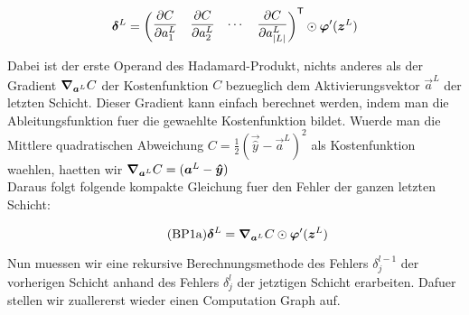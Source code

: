 \begin{equation*}
  \bm{\delta}^L = \begin{pmatrix} \displaystyle\frac{\partial C}{\partial a_1^L} & \displaystyle\frac{\partial C}{\partial a_2^L} & \cdots & \displaystyle\frac{\partial C}{\partial a_{|L|}^L}\end{pmatrix}^{\mathsf{T}} \odot \bm{\varphi}'(\bm{z}^L)
\end{equation*}

Dabei ist der erste Operand des Hadamard-Produkt, nichts anderes als
der Gradient $\bm{\nabla}_{\bm{a}^L} C$ der Kostenfunktion $C$ bezueglich dem Aktivierungsvektor
$\vec{a}^L$ der letzten Schicht. Dieser Gradient kann einfach berechnet werden, indem man die
Ableitungsfunktion fuer die gewaehlte Kostenfunktion bildet. Wuerde man die
Mittlere quadratischen Abweichung $C = \frac{1}{2}(\vec{\hat{y}} - \vec{a}^L)^2$ als Kostenfunktion waehlen, haetten wir
$\bm{\nabla}_{\bm{a}^L} C = (\bm{a}^L - \bm{\hat{y}})$  \\
Daraus folgt folgende kompakte Gleichung fuer den Fehler der ganzen letzten Schicht:

\begin{equation}\tag{BP1a}
  \bm{\delta}^L = \bm{\nabla}_{\bm{a}^L}C \odot \bm{\varphi}'(\bm{z}^L)
\end{equation}

\para{}
Nun muessen wir eine rekursive Berechnungsmethode des Fehlers $\delta_j^{l-1}$
der vorherigen Schicht anhand des Fehlers $\delta_j^l$ der jetztigen Schicht
erarbeiten. Dafuer stellen wir zuallererst wieder einen Computation Graph auf.

